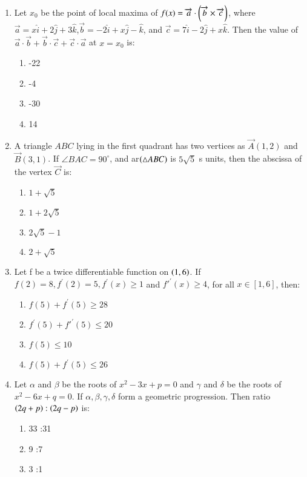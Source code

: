 \documentclass[journal,12pt,twocolumn]{IEEEtran}
\theoremstyle{remark}
\begin{document}
\begin{enumerate}
\begin{enumerate}
\end{enumerate}
\item Let $x_0$ be the point of local maxima of $f(x)=\overrightarrow{a}\cdot\left(\overrightarrow{b}\times \overrightarrow{c}\right)$, where $\overrightarrow{a}=x\hat{i}+2\hat{j}+3\hat{k}$,$\overrightarrow{b}=-2\hat{i}+x\hat{j}-\hat{k}$, and $\overrightarrow{c}=7\hat{i}-2\hat{j}+x\hat{k}$. Then the value of $ \overrightarrow{a}\cdot \overrightarrow{b}+\overrightarrow{b}\cdot \overrightarrow{c}+\overrightarrow{c}\cdot \overrightarrow{a}$ at $x=x_0$ is:
\begin{enumerate}
    \item -22
    \item -4
    \item -30
    \item 14
\end{enumerate}
\item A triangle $ABC$ lying in the first quadrant has two vertices as $ \vec{A}(1,2)$ and $\vec{B}(3,1)$. If $\angle BAC=90^\circ$, and ar$\left(\triangle ABC\right)$ is $5\sqrt{5}$ s units, then the abscissa of the vertex $\vec{C}$ is:
\begin{enumerate}
    \item $1+\sqrt{5}$
    \item $1+2\sqrt{5}$
    \item $2\sqrt{5}-1$
    \item $2+\sqrt{5}$
\end{enumerate}
\item Let f be a twice differentiable function on $\left(1,6\right)$. If $f(2)=8, f^\prime{}{}(2)=5, f^\prime(x)\geq1$ and $f'^\prime(x)\geq4$, for all $x\in [1,6]$, then:
\begin{enumerate}
    \item $f(5)+f^\prime(5)\geq28$
    \item $f^\prime(5)+f'^\prime(5)\leq20$
    \item $f(5)\leq10$
    \item $f(5)+f^\prime(5)\leq26$
\end{enumerate}
\item Let $\alpha$ and $\beta$ be the roots of $x^2-3x+p=0$ and $\gamma$ and $\delta$ be the roots of $x^2-6x+q=0$. If $\alpha,\beta,\gamma,\delta$ form a geometric progression. Then ratio $\left(2q+p\right):\left(2q-p\right)$ is:
\begin{enumerate}
    \item 33 :31
    \item 9 :7
    \item 3 :1

\end{enumerate}
\end{enumerate}
\end{document}
